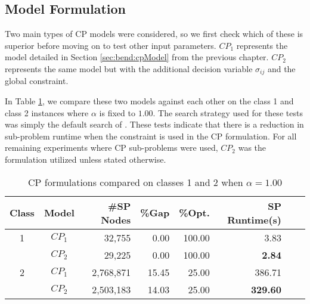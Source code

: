 


\subsection{Model Formulation}
\label{sec:exp:cpForm}
Two main types of CP models were considered, so we
first check which of these is superior before moving
on to test other input parameters.
$CP_1$ represents the model detailed in Section \ref{sec:bend:cpModel}
from the previous chapter.
$CP_2$ represents the same model but with the additional decision
variable $\sigma_{ij}$ and the \cumu global constraint.

In Table \ref{tab:exp:resultsCPmodel}, we compare these two models 
against each other on the class 1 and
class 2 instances where $\alpha$ is fixed to $1.00$.
The search strategy used for these tests was simply the default
search of \chuffed.
These tests indicate that there is a reduction
in sub-problem runtime when the \cumu constraint
is used in the CP formulation.
For all remaining experiments where CP sub-problems
were used, $CP_2$ was the formulation utilized
unless stated otherwise.

\begin{table}[tpb]
	\caption{CP formulations compared on classes 1 and 2 when $\alpha=1.00$}
	\centering
	\vspace{2mm}
	\begin{tabular}{ccrrrrrr}
		\toprule
		Class & Model & \#SP Nodes & \%Gap & \%Opt. & SP Runtime(s) \\\midrule\midrule
		1 & $CP_1$ & 32,755 & 0.00 & 100.00 & 3.83  \\
		 & $CP_2$ & 29,225 & 0.00 & 100.00 & \bf{2.84} \\\midrule
		2 & $CP_1$ & 2,768,871 & 15.45 & 25.00 & 386.71 \\
		 & $CP_2$ & 2,503,183 & 14.03 & 25.00 & \bf{329.60} \\
		\bottomrule
	\end{tabular}
	\label{tab:exp:resultsCPmodel}
\end{table}


